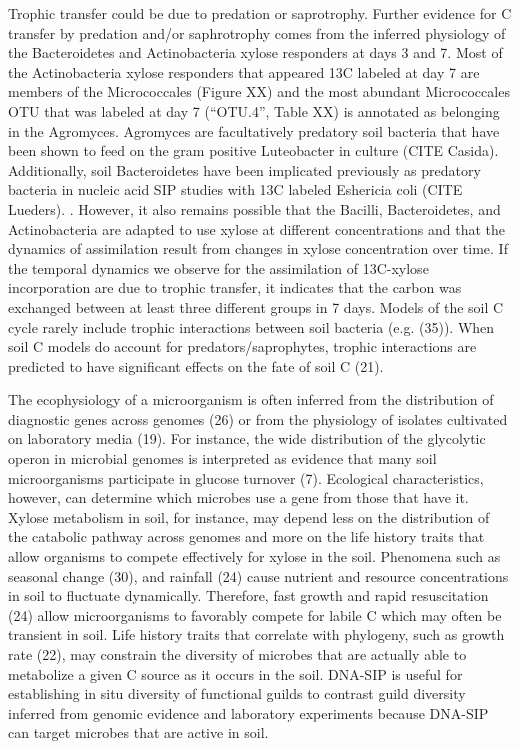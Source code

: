 Trophic transfer could be due to predation or saprotrophy. Further evidence for
C transfer by predation and/or saphrotrophy comes from the inferred physiology
of the Bacteroidetes and Actinobacteria xylose responders at days 3 and 7. Most
of the Actinobacteria xylose responders that appeared 13C labeled at day 7 are
members of the Micrococcales (Figure XX) and the most abundant Micrococcales
OTU that was labeled at day 7 (“OTU.4”, Table XX) is annotated as belonging in
the Agromyces. Agromyces are facultatively predatory soil bacteria that have
been shown to feed on the gram positive Luteobacter in culture (CITE Casida).
Additionally, soil Bacteroidetes have been implicated previously as predatory
bacteria in nucleic acid SIP studies with 13C labeled Eshericia coli (CITE
Lueders). .  However, it also remains possible that the Bacilli, Bacteroidetes,
and Actinobacteria are adapted to use xylose at different concentrations and
that the dynamics of assimilation result from changes in xylose concentration
over time. If the temporal dynamics we observe for the assimilation of
13C-xylose incorporation are due to trophic transfer, it indicates that the
carbon was exchanged between at least three different groups in 7 days. Models
of the soil C cycle rarely include trophic interactions between soil bacteria
(e.g. (35)). When soil C models do account for predators/saprophytes, trophic
interactions are predicted to have significant effects on the fate of soil
C (21). 

The ecophysiology of a microorganism is often inferred from the distribution of
diagnostic genes across genomes (26) or from the physiology of isolates
cultivated on laboratory media (19). For instance, the wide distribution of the
glycolytic operon in microbial genomes is interpreted as evidence that many
soil microorganisms participate in glucose turnover (7). Ecological
characteristics, however, can determine which microbes use a gene from those
that have it. Xylose metabolism in soil, for instance, may depend less on the
distribution of the catabolic pathway across genomes and more on the life
history traits that allow organisms to compete effectively for xylose in the
soil. Phenomena such as seasonal change (30), and rainfall (24) cause nutrient
and resource concentrations in soil to fluctuate dynamically. Therefore, fast
growth and rapid resuscitation (24) allow microorganisms to favorably compete
for labile C which may often be transient in soil. Life history traits that
correlate with phylogeny, such as growth rate (22), may constrain the diversity
of microbes that are actually able to metabolize a given C source as it occurs
in the soil. DNA-SIP is useful for establishing in situ diversity of functional
guilds to contrast guild diversity inferred from genomic evidence and
laboratory experiments because DNA-SIP can target microbes that are active in
soil. 

